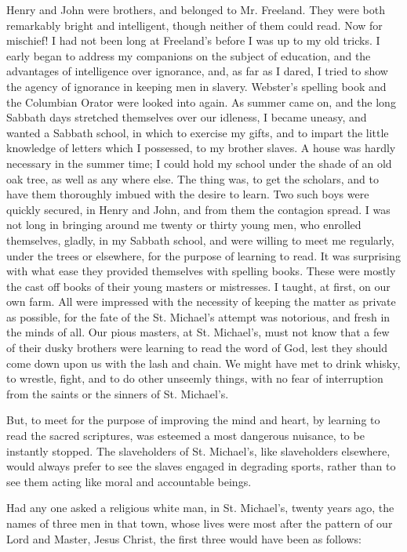 Henry and John were brothers, and belonged to Mr. Freeland. They were
both remarkably bright and intelligent, though neither of them could
read. Now for mischief! I had not been long at Freeland's before I was
up to my old tricks. I early began to address my companions on the
subject of education, and the advantages of intelligence over ignorance,
and, as far as I dared, I tried to show the agency of ignorance in
keeping men in slavery. Webster's spelling book and the Columbian Orator
were looked into again. As summer came on, and the long Sabbath days
stretched themselves over our idleness, I became uneasy, and wanted a
Sabbath school, in which to exercise my gifts, and to impart the little
knowledge of letters which I possessed, to my brother slaves. A house
was hardly necessary in the summer time; I could hold my school under
the shade {\protect\hypertarget{265}{}{}}of an old oak tree, as well as
any where else. The thing was, to get the scholars, and to have them
thoroughly imbued with the desire to learn. Two such boys were quickly
secured, in Henry and John, and from them the contagion spread. I was
not long in bringing around me twenty or thirty young men, who enrolled
themselves, gladly, in my Sabbath school, and were willing to meet me
regularly, under the trees or elsewhere, for the purpose of learning to
read. It was surprising with what ease they provided themselves with
spelling books. These were mostly the cast off books of their young
masters or mistresses. I taught, at first, on our own farm. All were
impressed with the necessity of keeping the matter as private as
possible, for the fate of the St. Michael's attempt was notorious, and
fresh in the minds of all. Our pious masters, at St. Michael's, must not
know that a few of their dusky brothers were learning to read the word
of God, lest they should come down upon us with the lash and chain. We
might have met to drink whisky, to wrestle, fight, and to do other
unseemly things, with no fear of interruption from the saints or the
sinners of St. Michael's.

But, to meet for the purpose of improving the mind and heart, by
learning to read the sacred scriptures, was esteemed a most dangerous
nuisance, to be instantly stopped. The slaveholders of St. Michael's,
like slaveholders elsewhere, would always prefer to see the slaves
engaged in degrading sports, rather than to see them acting like moral
and accountable beings.

Had any one asked a religious white man, in St.
{\protect\hypertarget{266}{}{}}Michael's, twenty years ago, the names of
three men in that town, whose lives were most after the pattern of our
Lord and Master, Jesus Christ, the first three would have been as
follows:

